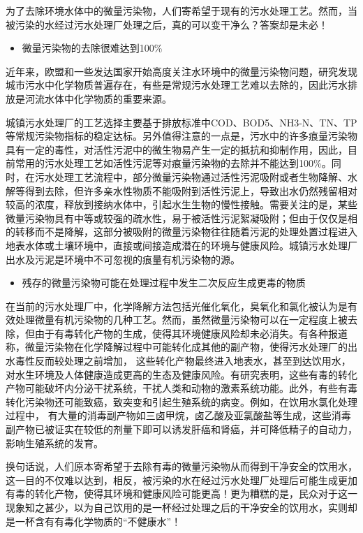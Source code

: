 \documentclass[
]{book}
\providecommand{\tightlist}{%
  \setlength{\itemsep}{0pt}\setlength{\parskip}{0pt}}
\begin{document}
为了去除环境水体中的微量污染物，人们寄希望于现有的污水处理工艺。然而，当被污染的水经过污水处理厂处理之后，真的可以变干净么？答案却是未必！

\begin{itemize}
\tightlist
\item
  微量污染物的去除很难达到100\%
\end{itemize}

近年来，欧盟和一些发达国家开始高度关注水环境中的微量污染物问题，研究发现城市污水中化学物质普遍存在，有些是常规污水处理工艺难以去除的，因此污水排放是河流水体中化学物质的重要来源。

城镇污水处理厂的工艺选择主要基于排放标准中COD、BOD5、NH3-N、TN、TP等常规污染物指标的稳定达标。另外值得注意的一点是，污水中的许多痕量污染物具有一定的毒性，对活性污泥中的微生物易产生一定的抵抗和抑制作用，因此，目前常用的污水处理工艺如活性污泥等对痕量污染物的去除并不能达到100\%。同时，在污水处理工艺流程中，部分微量污染物通过活性污泥吸附或者生物降解、水解等得到去除，但许多亲水性物质不能吸附到活性污泥上，导致出水仍然残留相对较高的浓度，释放到接纳水体中，引起水生生物的慢性接触。需要关注的是，某些微量污染物具有中等或较强的疏水性，易于被活性污泥絮凝吸附；但由于仅仅是相的转移而不是降解，这部分被吸附的微量污染物往往随着污泥的处理处置过程进入地表水体或土壤环境中，直接或间接造成潜在的环境与健康风险。城镇污水处理厂出水及污泥是环境中不可忽视的痕量有机污染物的源。

\begin{itemize}
\tightlist
\item
  残存的微量污染物可能在处理过程中发生二次反应生成更毒的物质
\end{itemize}

在当前的污水处理厂中，化学降解方法包括光催化氧化，臭氧化和氯化被认为是有效处理微量有机污染物的几种工艺。然而，虽然微量污染物可以在一定程度上被去除，但由于有毒转化产物的生成，使得其环境健康风险却未必消失。有各种报道称，微量污染物在化学降解过程中可能转化成其他的副产物，使得污水处理厂的出水毒性反而较处理之前增加， 这些转化产物最终进入地表水，甚至到达饮用水，对水生环境及人体健康造成更高的生态及健康风险。有研究表明，这些有毒的转化产物可能破坏内分泌干扰系统，干扰人类和动物的激素系统功能。此外，有些有毒转化污染物还可能致癌，致突变和引起生殖系统的病变。例如，在饮用水氯化处理过程中， 有大量的消毒副产物如三卤甲烷，卤乙酸及亚氯酸盐等生成，这些消毒副产物已被证实在较低的剂量下即可以诱发肝癌和肾癌，并可降低精子的自动力，影响生殖系统的发育。

换句话说，人们原本寄希望于去除有毒的微量污染物从而得到干净安全的饮用水，这一目的不仅难以达到，相反，被污染的水在经过污水处理厂处理后可能生成更加有毒的转化产物，使得其环境和健康风险可能更高！更为糟糕的是，民众对于这一现象知之甚少，以为自己饮用的是一杯经过处理之后的干净安全的饮用水，实则却是一杯含有有毒化学物质的``不健康水''！
\end{document}
